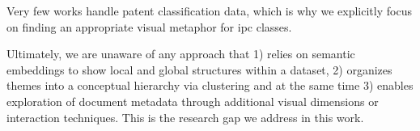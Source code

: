 Very few works handle patent classification data, which is why we explicitly focus on finding an appropriate visual metaphor for \gls{ipc} classes.

Ultimately, we are unaware of any approach that 1) relies on semantic embeddings to show local and global structures within a dataset, 2) organizes themes into a conceptual hierarchy via clustering and at the same time 3) enables exploration of document metadata through additional visual dimensions or interaction techniques.
This is the research gap we address in this work.